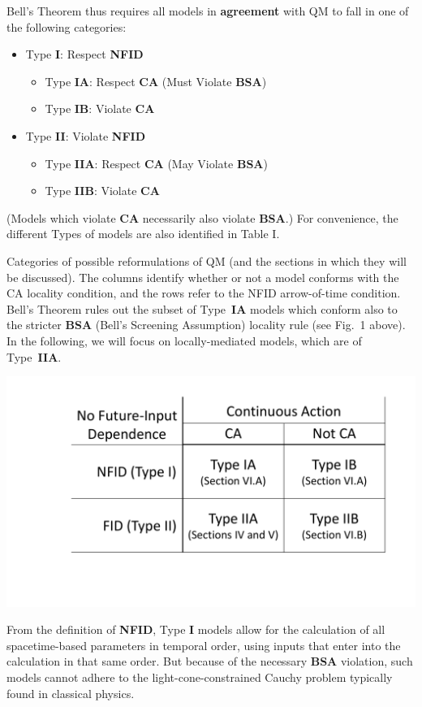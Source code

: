 \documentclass[rmp, aps, preprint, longbibliography]{revtex4-1}
\begin{document}
Bell's Theorem thus requires all models in {\bf agreement} with QM to fall in one of the following categories:
\begin{itemize}
\item Type {\bf I}: Respect {\bf NFID}
    \begin{itemize}
    \item Type {\bf IA}: Respect {\bf CA} (Must Violate {\bf BSA})
    \item Type {\bf IB}: Violate {\bf CA}
    \end{itemize}
\item Type {\bf II}: Violate {\bf NFID}
    \begin{itemize}
    \item Type {\bf IIA}: Respect {\bf CA} (May Violate {\bf BSA})
    \item Type {\bf IIB}: Violate {\bf CA}
    \end{itemize}
\end{itemize}
(Models which violate {\bf CA} necessarily also violate {\bf BSA}.)  For convenience, the different Types of models are also identified in Table I.

\begin{table}[b]%
\label{Table:Types}
\caption{Categories of possible reformulations of QM (and the sections in which they will be discussed).  The columns identify whether or not a model conforms with the CA locality condition, and the rows refer to the NFID arrow-of-time condition.  Bell's Theorem rules out the subset of Type~{\bf IA} models which conform also to the stricter {\bf BSA} (Bell's Screening Assumption) locality rule (see Fig.~1 above).  In the following, we will focus on locally-mediated models, which are of Type~{\bf IIA}.}
\centerline{\includegraphics[width=.7\textwidth]{TypeTable.pdf}}
\end{table}


From the definition of {\bf NFID}, Type {\bf I} models allow for the calculation of all spacetime-based parameters in temporal order, using inputs that enter into the calculation in that same order.  But because of the necessary {\bf BSA} violation, such models cannot adhere to the light-cone-constrained Cauchy problem typically found in classical physics.  
\end{document}
